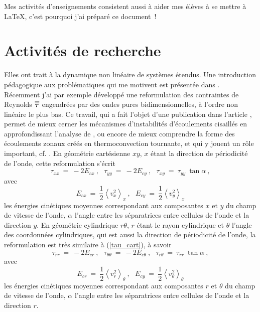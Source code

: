 \documentclass[12pt]{report}
\newcommand{\Ref}[1]{(\ref{#1})}
\newcommand{\taut}{\overline{\overline{\mbox{\boldmath{$\tau$}}}}}
\begin{document}
Mes activités d'enseignements consistent aussi à aider mes élèves à se mettre à \LaTeX,
c'est pourquoi j'ai préparé ce document~!
\section{Activités de recherche}
Elles ont trait à la dynamique non linéaire de systèmes étendus.
Une introduction pédagogique aux problématiques qui me motivent est présentée
dans \cite{Manneville-91}.
Récemment j'ai par exemple développé une reformulation
des contraintes de Reynolds $\taut$
engendrées par des ondes pures bidimensionnelles,
à l'ordre non linéaire le plus bas.
Ce travail, qui a fait l'objet d'une publication dans l'article
\cite{Plaut-etal-08}, permet de mieux cerner les mécanismes d'instabilités
d'écoulements cisaillés en approfondissant l'analyse de
\cite{Pedlosky-87}, ou encore de mieux comprendre la forme des
écoulements zonaux créés en thermoconvection tournante,
et qui y jouent un rôle important, cf. \cite{Morin-Dormy-06}.
En géométrie cartésienne $xy$, $x$ étant la direction de périodicité de l'onde,
cette reformulation s'écrit
\begin{equation}
  \label{tau_cart}
  \tau_{xx}~=~-2E_{cx}~,~~~\tau_{yy}~=~-2E_{cy}~,~~~
  \tau_{xy}~=~\tau_{yy}~\tan\alpha~,
\end{equation}
avec
\begin{equation}
  E_{cx}~=~\frac{1}{2}\left<v_x^2\right>_x~,~~~
  E_{cy}~=~\frac{1}{2}\left<v_y^2\right>_x
\end{equation}
les énergies cinétiques moyennes correspondant aux composantes $x$ et $y$
du champ de vitesse de l'onde,
$\alpha$ l'angle entre les séparatrices entre cellules de l'onde
et la direction $y$.
En géométrie cylindrique $r\theta$, $r$ étant le rayon cylindrique
et $\theta$ l'angle des coordonnées cylindriques,
qui est aussi la direction de périodicité de l'onde,
la reformulation est très similaire à \Ref{tau_cart},
à savoir
\begin{equation}
  \label{tau_cyl}
  \tau_{rr}~=~-2E_{cr}~,~~~\tau_{\theta\theta}~=~-2E_{c\theta}~,~~~
  \tau_{r\theta}~=~\tau_{rr}~\tan\alpha~,
\end{equation}
avec
\begin{equation}
  E_{cr}~=~\frac{1}{2}\left<v_r^2\right>_\theta~,~~~
  E_{cy}~=~\frac{1}{2}\left<v_\theta^2\right>_\theta
\end{equation}
les énergies cinétiques moyennes correspondant aux composantes $r$
et $\theta$
du champ de vitesse de l'onde,
$\alpha$ l'angle entre les séparatrices entre cellules de l'onde
et la direction $r$.
\end{document}
